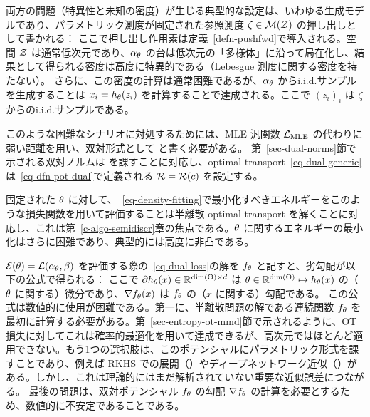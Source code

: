 両方の問題（特異性と未知の密度）が生じる典型的な設定は、いわゆる生成モデルであり、パラメトリック測度が固定された参照測度 $\zeta \in \mathcal{M}(\mathcal{Z})$ の押し出しとして書かれる：
\eq{
	\al_\th = \fPF_{\th,\sharp} \zeta \qwhereq \fPF_\th : \Zz \rightarrow \Xx,
}
ここで押し出し作用素は定義~\ref{defn-pushfwd}で導入される。空間 $\mathcal{Z}$ は通常低次元であり、$\alpha_\theta$ の台は低次元の「多様体」に沿って局在化し、結果として得られる密度は高度に特異的である（Lebesgue 測度に関する密度を持たない）。
さらに、この密度の計算は通常困難であるが、$\alpha_\theta$ からi.i.d.サンプルを生成することは $x_i=h_\theta(z_i)$ を計算することで達成される。ここで $(z_i)_i$ は $\zeta$ からのi.i.d.サンプルである。

このような困難なシナリオに対処するためには、MLE 汎関数 $\mathcal{L}_{\text{MLE}}$ の代わりに弱い距離を用い、双対形式として
と書く必要がある。
第~\ref{sec-dual-norms}節で示される双対ノルムは
を課すことに対応し、optimal transport~\eqref{eq-dual-generic}は~\eqref{eq-dfn-pot-dual}で定義される $\mathcal{R} = \mathcal{R}(c)$ を設定する。

固定された $\theta$ に対して、~\eqref{eq-density-fitting}で最小化すべきエネルギーをこのような損失関数を用いて評価することは半離散 optimal transport を解くことに対応し、これは第~\ref{c-algo-semidiscr}章の焦点である。$\theta$ に関するエネルギーの最小化はさらに困難であり、典型的には高度に非凸である。

$\mathcal{E}(\theta) = \mathcal{L}(\alpha_\theta,\beta)$ を評価する際の~\eqref{eq-dual-loss}の解を $f_\theta$ と記すと、劣勾配が以下の公式で得られる：
ここで $\partial h_\theta(x) \in \mathbb{R}^{\text{dim}(\Theta) \times d}$ は $\theta \in \mathbb{R}^{\text{dim}(\Theta)} \mapsto h_\theta(x)$ の（$\theta$ に関する）微分であり、$\nabla f_\theta(x)$ は $f_\theta$ の（$x$ に関する）勾配である。
この公式は数値的に使用が困難である。第一に、半離散問題の解である連続関数 $f_\theta$ を最初に計算する必要がある。第~\ref{sec-entropy-ot-mmd}節で示されるように、OT 損失に対してこれは確率的最適化を用いて達成できるが、高次元ではほとんど適用できない。もう1つの選択肢は、このポテンシャルにパラメトリック形式を課すことであり、例えば RKHS での展開（\citet{genevay2016stochastic}）やディープネットワーク近似（\citep{WassersteinGAN}）がある。しかし、これは理論的にはまだ解析されていない重要な近似誤差につながる。
最後の問題は、双対ポテンシャル $f_\theta$ の勾配 $\nabla f_\theta$ の計算を必要とするため、数値的に不安定であることである。

